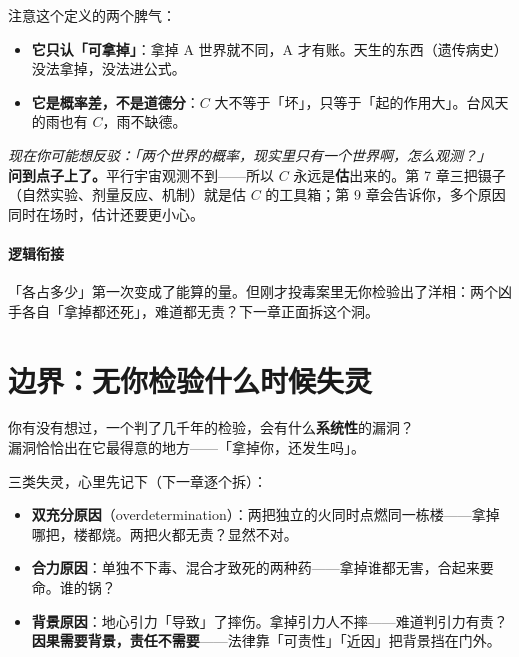 \documentclass[../../main2.tex]{subfiles}
\begin{document}
注意这个定义的两个脾气：

\begin{itemize}
	\item \textbf{它只认「可拿掉」}：拿掉 A 世界就不同，A 才有账。天生的东西（遗传病史）没法拿掉，没法进公式。
	\item \textbf{它是概率差，不是道德分}：$C$ 大不等于「坏」，只等于「起的作用大」。台风天的雨也有 $C$，雨不缺德。
\end{itemize}

\begin{questionbox}
	\textit{现在你可能想反驳：「两个世界的概率，现实里只有一个世界啊，怎么观测？」}\\
	\textbf{问到点子上了。}平行宇宙观测不到——所以 $C$ 永远是\textbf{估}出来的。第 7 章三把镊子（自然实验、剂量反应、机制）就是估 $C$ 的工具箱；第 9 章会告诉你，多个原因同时在场时，估计还要更小心。
\end{questionbox}

\paragraph*{逻辑衔接}
	「各占多少」第一次变成了能算的量。但刚才投毒案里无你检验出了洋相：两个凶手各自「拿掉都还死」，难道都无责？下一章正面拆这个洞。

\section{边界：无你检验什么时候失灵}

\begin{readingnote}
	你有没有想过，一个判了几千年的检验，会有什么\textbf{系统性}的漏洞？\\
	漏洞恰恰出在它最得意的地方——「拿掉你，还发生吗」。
\end{readingnote}

三类失灵，心里先记下（下一章逐个拆）：

\begin{itemize}
	\item \textbf{双充分原因}（overdetermination）：两把独立的火同时点燃同一栋楼——拿掉哪把，楼都烧。两把火都无责？显然不对。
	\item \textbf{合力原因}：单独不下毒、混合才致死的两种药——拿掉谁都无害，合起来要命。谁的锅？
	\item \textbf{背景原因}：地心引力「导致」了摔伤。拿掉引力人不摔——难道判引力有责？\textbf{因果需要背景，责任不需要}——法律靠「可责性」「近因」把背景挡在门外。
\end{itemize}
\end{document}
